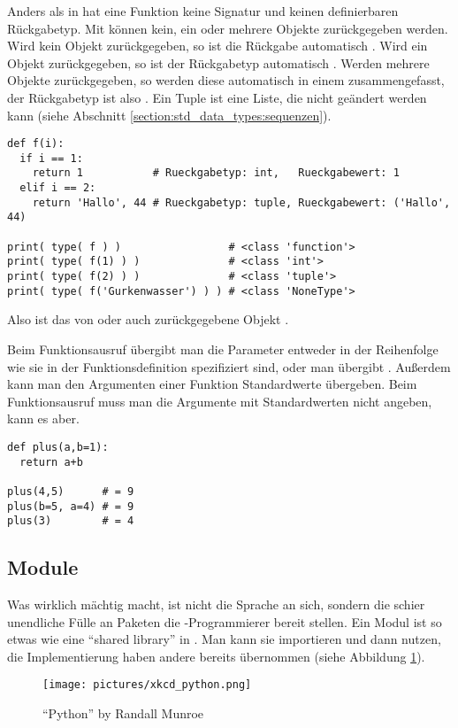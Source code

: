 Anders als in \CC hat eine Funktion keine Signatur und keinen definierbaren Rückgabetyp.
Mit  können kein, ein oder mehrere Objekte zurückgegeben werden.
Wird kein Objekt zurückgegeben, so ist die Rückgabe automatisch .
Wird ein Objekt  zurückgegeben, so ist der Rückgabetyp automatisch .
Werden mehrere Objekte zurückgegeben, so werden diese automatisch in einem  zusammengefasst, der Rückgabetyp ist also .
Ein Tuple ist eine Liste, die nicht geändert werden kann (siehe Abschnitt \ref{section:std_data_types:sequenzen}).
\begin{lstlisting}
def f(i):
  if i == 1:
    return 1           # Rueckgabetyp: int,   Rueckgabewert: 1
  elif i == 2:
    return 'Hallo', 44 # Rueckgabetyp: tuple, Rueckgabewert: ('Hallo', 44)

print( type( f ) )                 # <class 'function'>
print( type( f(1) ) )              # <class 'int'>
print( type( f(2) ) )              # <class 'tuple'>
print( type( f('Gurkenwasser') ) ) # <class 'NoneType'>
\end{lstlisting}
Also ist das von  oder auch  zurückgegebene Objekt .

Beim Funktionsausruf übergibt man die Parameter entweder in der Reihenfolge wie sie in der Funktionsdefinition spezifiziert sind, oder man übergibt .
Außerdem kann man den Argumenten einer Funktion Standardwerte übergeben.
Beim Funktionsausruf muss man die Argumente mit Standardwerten nicht angeben, kann es aber.
\begin{lstlisting}
def plus(a,b=1):
  return a+b

plus(4,5)      # = 9
plus(b=5, a=4) # = 9
plus(3)        # = 4
\end{lstlisting}


\subsection{Module}
\label{section:crashkurs:module}
Was \Python wirklich mächtig macht, ist nicht die Sprache an sich, sondern die schier unendliche Fülle an Paketen die \Python-Programmierer bereit stellen.
Ein Modul ist so etwas wie eine ``shared library'' in \CC.
Man kann sie importieren und dann nutzen, die Implementierung haben andere bereits übernommen (siehe Abbildung \ref{figure:xkcd_python}).
\begin{figure}[ht]
  \centering
  \texttt{[image: pictures/xkcd\_python.png]}
  \caption{\label{figure:xkcd_python}``Python'' by Randall Munroe \cite{Munroe_python}}
\end{figure}

